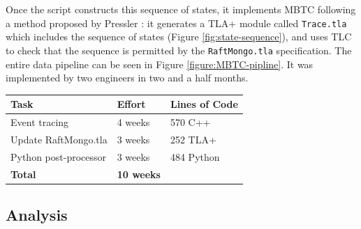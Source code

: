 \documentclass{vldb}
\begin{document}
Once the script constructs this sequence of states, it implements MBTC following a method proposed by Pressler \cite{Pressler18VerifyingSoftwareTracesTLAPlus}: it generates a TLA+ module called \texttt{Trace.tla} which includes the sequence of states (Figure \ref{fig:state-sequence}), and uses TLC to check that the sequence is permitted by the \texttt{RaftMongo.tla} specification.
The entire data pipeline can be seen in Figure \ref{figure:MBTC-pipline}. 
It was implemented by two engineers in two and a half months.

\begin{center}
\begin{tabular}{ | m{11em} | m{5em}| m{6em} | } 
\hline
Task & Effort & Lines of Code \\  
\hline
Event tracing & 4 weeks & 570 C++ \\ 
Update RaftMongo.tla & 3 weeks & 252 TLA+\\ 
Python post-processor & 3 weeks & 484 Python \\ 
\textbf{Total} & \textbf{10 weeks} & \\
\hline
\end{tabular}
\end{center}

\subsection{Analysis}
\label{subsec:mbtc_analysis}

\end{document}
